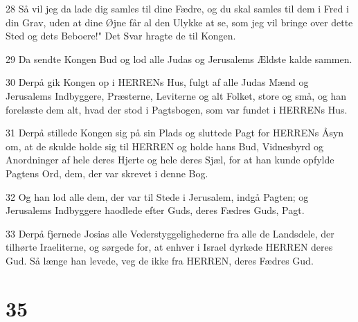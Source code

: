 \par 28 Så vil jeg da lade dig samles til dine Fædre, og du skal samles til dem i Fred i din Grav, uden at dine Øjne får al den Ulykke at se, som jeg vil bringe over dette Sted og dets Beboere!" Det Svar hragte de til Kongen.
\par 29 Da sendte Kongen Bud og lod alle Judas og Jerusalems Ældste kalde sammen.
\par 30 Derpå gik Kongen op i HERRENs Hus, fulgt af alle Judas Mænd og Jerusalems Indbyggere, Præsterne, Leviterne og alt Folket, store og små, og han forelæste dem alt, hvad der stod i Pagtsbogen, som var fundet i HERRENs Hus.
\par 31 Derpå stillede Kongen sig på sin Plads og sluttede Pagt for HERRENs Åsyn om, at de skulde holde sig til HERREN og holde hans Bud, Vidnesbyrd og Anordninger af hele deres Hjerte og hele deres Sjæl, for at han kunde opfylde Pagtens Ord, dem, der var skrevet i denne Bog.
\par 32 Og han lod alle dem, der var til Stede i Jerusalem, indgå Pagten; og Jerusalems Indbyggere haodlede efter Guds, deres Fædres Guds, Pagt.
\par 33 Derpå fjernede Josias alle Vederstyggelighederne fra alle de Landsdele, der tilhørte Iraeliterne, og sørgede for, at enhver i Israel dyrkede HERREN deres Gud. Så længe han levede, veg de ikke fra HERREN, deres Fædres Gud.

\chapter{35}

